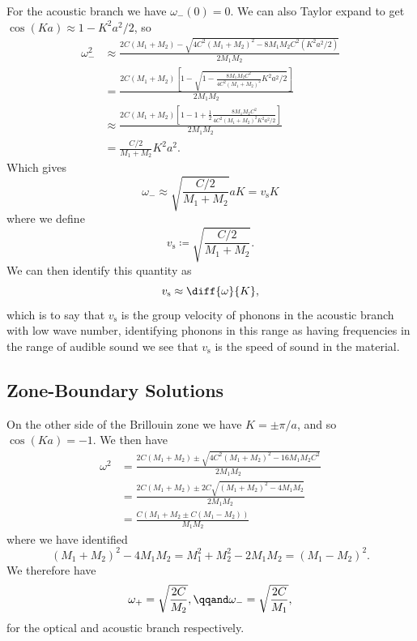 \documentclass[fleqn]{NotesClass}
\newcommand*{\sound}{\mathrm{s}}
\begin{document}
    For the acoustic branch we have \(\omega_{-}(0) = 0\).
    We can also Taylor expand to get \(\cos(Ka) \approx 1 - K^2a^2/2\), so
    \begin{align}
        \omega_{-}^2 &\approx \frac{2C(M_1 + M_2) - \sqrt{4C^2(M_1 + M_2)^2 - 8M_1M_2C^2(K^2a^2/2)}}{2M_1M_2}\\
        &= \frac{2C(M_1 + M_2)\left[ 1 - \sqrt{1 - \frac{8M_1M_2C^2}{4C^2(M_1 + M_2)^2}K^2a^2/2} \right]}{2M_1M_2}\\
        &\approx \frac{2C(M_1 + M_2)\left[ 1 - 1 + \frac{1}{2} \frac{8M_1M_2C^2}{4C^2(M_1 + M_2)^2K^2a^2/2} \right]}{2M_1M_2}\\
        &= \frac{C/2}{M_1 + M_2} K^2a^2.
    \end{align}
    Which gives
    \begin{equation}
        \omega_{-} \approx \sqrt{\frac{C/2}{M_1 + M_2}} aK = v_{\sound}K
    \end{equation}
    where we define
    \begin{equation}
        v_{\sound} \coloneqq \sqrt{\frac{C/2}{M_1 + M_2}}.
    \end{equation}
    We can then identify this quantity as
    \begin{equation}
        v_{\sound} \approx \diff{\omega}{K},
    \end{equation}
    which is to say that \(v_{\sound}\) is the group velocity of phonons in the acoustic branch with low wave number, identifying phonons in this range as having frequencies in the range of audible sound we see that \(v_{\sound}\) is the speed of sound in the material.
    
    \subsection{Zone-Boundary Solutions}
    On the other side of the Brillouin zone we have \(K = \pm \pi/a\), and so \(\cos(Ka) = -1\).
    We then have
    \begin{align}
        \omega^2 &= \frac{2C(M_1 + M_2) \pm \sqrt{4C^2(M_1 + M_2)^2 - 16M_1M_2C^2}}{2M_1M_2}\\
        &= \frac{2C(M_1 + M_2) \pm 2C\sqrt{(M_1 + M_2)^2 - 4M_1M_2}}{2M_1M_2}\\
        &= \frac{C(M_1 + M_2 \pm C(M_1 - M_2))}{M_1 M_2}
    \end{align}
    where we have identified
    \begin{equation}
        (M_1 + M_2)^2 - 4M_1M_2 = M_1^2 + M_2^2 - 2M_1M_2 = (M_1 - M_2)^2.
    \end{equation}
    We therefore have
    \begin{equation}
        \omega_{+} = \sqrt{\frac{2C}{M_2}}, \qqand \omega_{-} = \sqrt{\frac{2C}{M_1}},
    \end{equation}
    for the optical and acoustic branch respectively.
    
\end{document}
